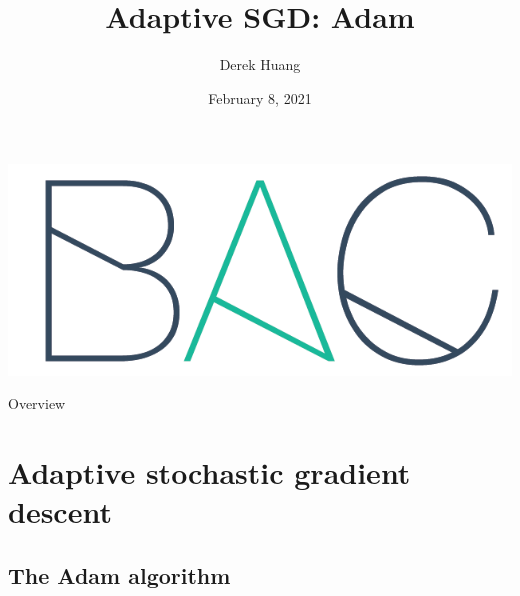 \documentclass{beamer}
\title[Adaptive SGD: Adam]{Adaptive SGD: Adam}
\author[Derek Huang (BAC Advanced Team)]{Derek Huang}
\institute[BAC Advanced Team]{BAC Advanced Team}
\date[February 8, 2020]{February 8, 2021}
\begin{document}
\begin{frame}
    \titlepage
    \centering
    \includegraphics[scale = 0.1]{bac_logo1.png}
\end{frame}

\begin{frame}{Overview}
    \tableofcontents
\end{frame}

\section{Adaptive stochastic gradient descent}

\subsection{The Adam algorithm}
\end{document}
